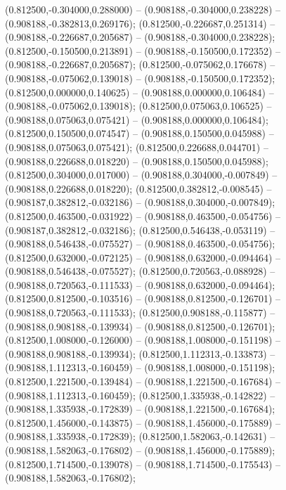  (0.812500,-0.304000,0.288000) -- (0.908188,-0.304000,0.238228) -- (0.908188,-0.382813,0.269176);
 (0.812500,-0.226687,0.251314) -- (0.908188,-0.226687,0.205687) -- (0.908188,-0.304000,0.238228);
 (0.812500,-0.150500,0.213891) -- (0.908188,-0.150500,0.172352) -- (0.908188,-0.226687,0.205687);
 (0.812500,-0.075062,0.176678) -- (0.908188,-0.075062,0.139018) -- (0.908188,-0.150500,0.172352);
 (0.812500,0.000000,0.140625) -- (0.908188,0.000000,0.106484) -- (0.908188,-0.075062,0.139018);
 (0.812500,0.075063,0.106525) -- (0.908188,0.075063,0.075421) -- (0.908188,0.000000,0.106484);
 (0.812500,0.150500,0.074547) -- (0.908188,0.150500,0.045988) -- (0.908188,0.075063,0.075421);
 (0.812500,0.226688,0.044701) -- (0.908188,0.226688,0.018220) -- (0.908188,0.150500,0.045988);
 (0.812500,0.304000,0.017000) -- (0.908188,0.304000,-0.007849) -- (0.908188,0.226688,0.018220);
 (0.812500,0.382812,-0.008545) -- (0.908187,0.382812,-0.032186) -- (0.908188,0.304000,-0.007849);
 (0.812500,0.463500,-0.031922) -- (0.908188,0.463500,-0.054756) -- (0.908187,0.382812,-0.032186);
 (0.812500,0.546438,-0.053119) -- (0.908188,0.546438,-0.075527) -- (0.908188,0.463500,-0.054756);
 (0.812500,0.632000,-0.072125) -- (0.908188,0.632000,-0.094464) -- (0.908188,0.546438,-0.075527);
 (0.812500,0.720563,-0.088928) -- (0.908188,0.720563,-0.111533) -- (0.908188,0.632000,-0.094464);
 (0.812500,0.812500,-0.103516) -- (0.908188,0.812500,-0.126701) -- (0.908188,0.720563,-0.111533);
 (0.812500,0.908188,-0.115877) -- (0.908188,0.908188,-0.139934) -- (0.908188,0.812500,-0.126701);
 (0.812500,1.008000,-0.126000) -- (0.908188,1.008000,-0.151198) -- (0.908188,0.908188,-0.139934);
 (0.812500,1.112313,-0.133873) -- (0.908188,1.112313,-0.160459) -- (0.908188,1.008000,-0.151198);
 (0.812500,1.221500,-0.139484) -- (0.908188,1.221500,-0.167684) -- (0.908188,1.112313,-0.160459);
 (0.812500,1.335938,-0.142822) -- (0.908188,1.335938,-0.172839) -- (0.908188,1.221500,-0.167684);
 (0.812500,1.456000,-0.143875) -- (0.908188,1.456000,-0.175889) -- (0.908188,1.335938,-0.172839);
 (0.812500,1.582063,-0.142631) -- (0.908188,1.582063,-0.176802) -- (0.908188,1.456000,-0.175889);
 (0.812500,1.714500,-0.139078) -- (0.908188,1.714500,-0.175543) -- (0.908188,1.582063,-0.176802);

